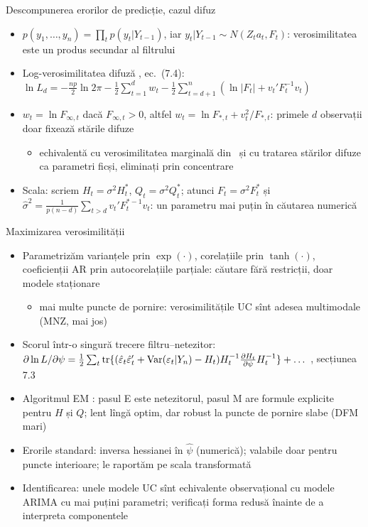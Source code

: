 \begin{frame}{Descompunerea erorilor de predicție, cazul difuz}
\itemsize{\small}
\begin{itemize}
    \item $p(y_1, \dots, y_n) = \prod_t p(y_t | Y_{t-1})$, iar $y_t | Y_{t-1} \sim N(Z_ta_t, F_t)$: verosimilitatea este un produs secundar al filtrului
    \item Log-verosimilitatea difuză , ec.~(7.4): $\ln L_d = -\frac{np}{2}\ln 2\pi - \frac12\sum_{t=1}^d w_t - \frac12\sum_{t=d+1}^n(\ln|F_t| + v_t'F_t^{-1}v_t)$
    \item $w_t = \ln F_{\infty,t}$ dacă $F_{\infty,t} > 0$, altfel $w_t = \ln F_{*,t} + v_t^2/F_{*,t}$: primele $d$ observații doar fixează stările difuze
    \begin{itemize}
        \item echivalentă cu verosimilitatea marginală din \ și cu tratarea stărilor difuze ca parametri ficși, eliminați prin concentrare
    \end{itemize}
    \item Scala: scriem $H_t = \sigma^2H^*_t$, $Q_t = \sigma^2Q^*_t$; atunci $F_t = \sigma^2F^*_t$ și $\hat\sigma^2 = \frac{1}{p(n - d)}\sum_{t>d}v_t'F_t^{*-1}v_t$: un parametru mai puțin în căutarea numerică
\end{itemize}
\end{frame}

\begin{frame}{Maximizarea verosimilității}
\itemsize{\small}
\begin{itemize}
    \item Parametrizăm varianțele prin $\exp(\cdot)$, corelațiile prin $\tanh(\cdot)$, coeficienții AR prin autocorelațiile parțiale: căutare fără restricții, doar modele staționare
    \begin{itemize}
        \item mai multe puncte de pornire: verosimilitățile UC sînt adesea multimodale (MNZ, mai jos)
    \end{itemize}
    \item Scorul într-o singură trecere filtru--netezitor: $\partial\ln L/\partial\psi = \frac12\sum_t\mathrm{tr}\{(\hat\varepsilon_t\hat\varepsilon_t' + \text{Var}(\varepsilon_t|Y_n) - H_t)H_t^{-1}\tfrac{\partial H_t}{\partial\psi}H_t^{-1}\} + \dots$ , secțiunea 7.3
    \item Algoritmul EM : pasul E este netezitorul, pasul M are formule explicite pentru $H$ și $Q$; lent lîngă optim, dar robust la puncte de pornire slabe (DFM mari)
    \item Erorile standard: inversa hessianei în $\hat\psi$ (numerică); valabile doar pentru puncte interioare; le raportăm pe scala transformată
    \item Identificarea: unele modele UC sînt echivalente observațional cu modele ARIMA cu mai puțini parametri; verificați forma redusă înainte de a interpreta componentele
\end{itemize}
\end{frame}

